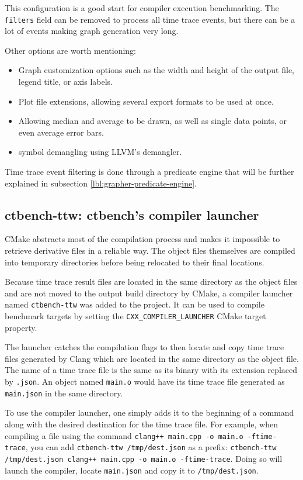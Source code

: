 \documentclass[../main]{subfiles}
\begin{document}
This configuration is a good start for compiler execution benchmarking. The
\lstinline{filters} field can be removed to process all time trace events,
but there can be a lot of events making graph generation very long.

Other options are worth mentioning:

\begin{itemize}
\item Graph customization options such as the width and height of the output
      file, legend title, or axis labels.
\item Plot file extensions, allowing several export formats to be used at once.
\item Allowing median and average to be drawn, as well as single data points,
      or even average error bars.
\item \cpp symbol demangling using LLVM's demangler.
\end{itemize}

Time trace event filtering is done through a predicate engine that will be
further explained in subsection \ref{lbl:grapher-predicate-engine}.

\subsection{ctbench-ttw: ctbench's compiler launcher}
\label{lbl:ctbench-ttw}

CMake abstracts most of the compilation process and makes it impossible to
retrieve derivative files in a reliable way. The object files themselves are
compiled into temporary directories before being relocated to their final
locations.

Because time trace result files are located in the same directory as the object
files and are not moved to the output build directory by CMake, a compiler
launcher named \lstinline{ctbench-ttw} was added to the project.
It can be used to compile benchmark targets by setting the
\lstinline{CXX_COMPILER_LAUNCHER} CMake target property.

The launcher catches the compilation flags to then locate and copy time trace
files generated by Clang which are located in the same directory as the object
file. The name of a time trace file is the same as its binary with its extension
replaced by \lstinline{.json}. An object named \lstinline{main.o} would have its
time trace file generated as \lstinline{main.json} in the same directory.

To use the compiler launcher, one simply adds it to the beginning of a command
along with the desired destination for the time trace file.
For example, when compiling a \cpp file using the command
\lstinline{clang++ main.cpp -o main.o -ftime-trace}, you can add
\lstinline{ctbench-ttw /tmp/dest.json} as a prefix:
\lstinline{ctbench-ttw /tmp/dest.json clang++ main.cpp -o main.o -ftime-trace}.
Doing so will launch the compiler, locate \lstinline{main.json} and copy it to
\lstinline{/tmp/dest.json}.
\end{document}

